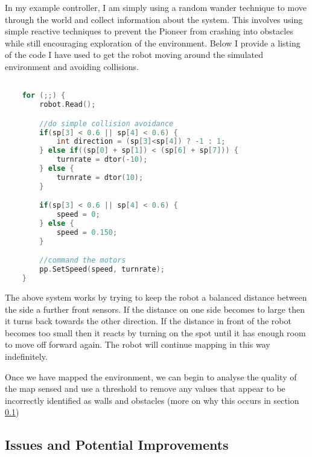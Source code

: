 \documentclass{article}
\begin{document}
In my example controller, I am simply using a random wander technique to move through the world and collect information about the system. This involves using simple reactive techniques to prevent the Pioneer from crashing into obstacles while still encouraging exploration of the environment. Below I provide a listing of the code I have used to get the robot moving around the simulated environment and avoiding collisions.

\begin{center}
	\begin{lstlisting}[language=c++, showstringspaces=false, caption={C++ code used to make control the robot to reactively wander through the environment}]

	for (;;) {
		robot.Read();

		//do simple collision avoidance
		if(sp[3] < 0.6 || sp[4] < 0.6) {
			int direction = (sp[3]<sp[4]) ? -1 : 1;
		} else if((sp[0] + sp[1]) < (sp[6] + sp[7])) {
			turnrate = dtor(-10);
		} else {
			turnrate = dtor(10);
		}

		if(sp[3] < 0.6 || sp[4] < 0.6) {
			speed = 0;
		} else {
			speed = 0.150;
		}

		//command the motors
		pp.SetSpeed(speed, turnrate);
	}

	\end{lstlisting}
\end{center}

The above system works by trying to keep the robot a balanced distance between the side a further front sensors. If the distance on one side becomes to large then it turns back towards the other direction. If the distance in front of the robot becomes too small then it reacts by turning on the spot until it has enough room to move off forward again. The robot will continue mapping in this way indefinitely.

Once we have mapped the environment, we can begin to analyse the quality of the map sensed and use a threshold to remove any values that appear to be incorrectly identified as walls and obstacles (more on why this occurs in section \ref{sec:issues})

\subsection{Issues and Potential Improvements}
\label{sec:issues}
\end{document}

